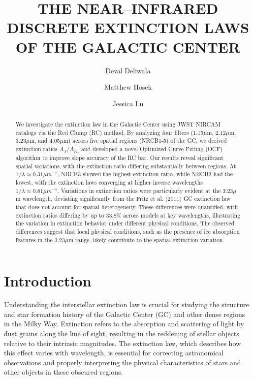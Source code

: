 \documentclass[twocolumn]{aastex631}
\begin{document}
\title{THE NEAR--INFRARED DISCRETE EXTINCTION LAWS OF THE GALACTIC CENTER}

\author{Deval Deliwala}

\author{Matthew Hosek} 

\author{Jessica Lu} 


\begin{abstract}
We investigate the extinction law in the Galactic Center using JWST NIRCAM
catalogs via the Red Clump (RC) method. By analyzing four filters (1.15$\mu$m,
2.12$\mu$m, 3.23$\mu$m, and 4.05$\mu$m) across five spatial regions (NRCB1-5)
of the GC, we derived extinction ratios $A_\lambda / A_{K_s}$ and developed
a novel Optimized Curve Fitting (OCF) algorithm to improve slope accuracy of
the RC bar. Our results reveal significant spatial variations, with the
extinction ratio differing substantially between regions. At $1/\lambda \approx
0.31\mu m^{-1}$, NRCB3 showed the highest extinction ratio, while NRCB2 had the lowest, with the extinction laws converging at higher inverse wavelengths $1/\lambda \approx 0.81\mu m^{-1}$. Variations in extinction ratios were particularly evident at the 3.23$\mu$m wavelength, deviating significantly from the Fritz et al. (2011) GC extinction law that does not account for spatial heterogeneity. These differences were quantified, with extinction ratios differing by up to 33.8\% across models at key wavelengths, illustrating the variation in extinction behavior under different physical conditions. The observed differences suggest that local physical conditions, such as the presence of ice absorption features in the 3.23$\mu$m range, likely contribute to the spatial extinction variation.
\end{abstract}



\section{Introduction}
Understanding the interstellar extinction law is crucial for studying the structure and star formation history of the Galactic Center (GC) and other dense regions in the Milky Way. Extinction refers to the absorption and scattering of light by dust grains along the line of sight, resulting in the reddening of stellar objects relative to their intrinsic magnitudes. The extinction law, which describes how this effect varies with wavelength, is essential for correcting astronomical observations and properly interpreting the physical characteristics of stars and other objects in these obscured regions.
\end{document}
